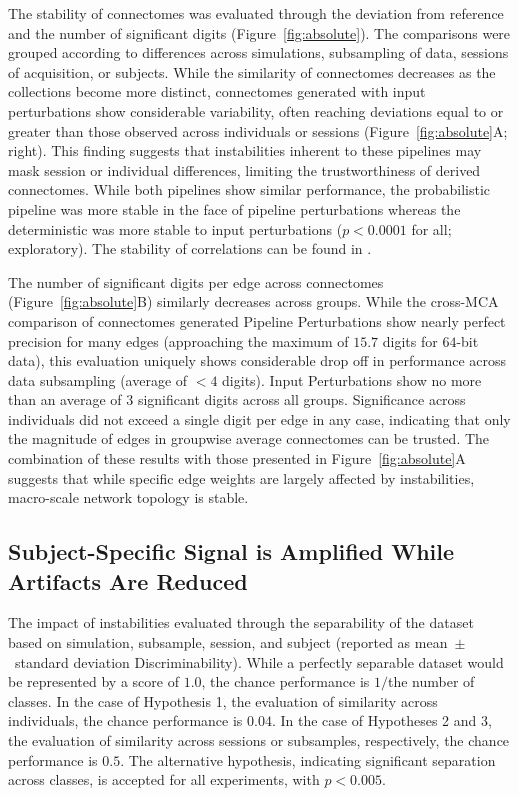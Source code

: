 \documentclass[fleqn,10pt]{SelfArx} %
\begin{document}
The stability of connectomes was evaluated through the deviation from reference and the number of significant digits
(Figure~\ref{fig:absolute}). The comparisons were grouped according to differences across simulations, subsampling
of data, sessions of acquisition, or subjects. While the similarity of connectomes decreases as the collections become
more distinct, connectomes generated with input perturbations show considerable variability, often reaching deviations
equal to or greater than those observed across individuals or sessions (Figure~\ref{fig:absolute}A; right). This
finding suggests that instabilities inherent to these pipelines may mask session or individual differences, limiting
the trustworthiness of derived connectomes. While both pipelines show similar performance, the probabilistic pipeline
was more stable in the face of pipeline perturbations whereas the deterministic was more stable to input perturbations
($p < 0.0001$ for all; exploratory). The stability of correlations can be found in .

The number of significant digits per edge across connectomes (Figure~\ref{fig:absolute}B) similarly decreases across
groups. While the cross-MCA comparison of connectomes generated Pipeline Perturbations show nearly perfect precision
for many edges (approaching the maximum of $15.7$ digits for $64$-bit data), this evaluation uniquely shows
considerable drop off in performance across data subsampling (average of $< 4$ digits). Input Perturbations show no
more than an average of $3$ significant digits across all groups. Significance across individuals did not exceed a
single digit per edge in any case, indicating that only the magnitude of edges in groupwise average connectomes can be
trusted. The combination of these results with those presented in Figure~\ref{fig:absolute}A suggests that while
specific edge weights are largely affected by instabilities, macro-scale network topology is stable.

\subsection*{Subject-Specific Signal is Amplified While Artifacts Are Reduced}
\begin{table}[ht]\centering
\caption{The impact of instabilities evaluated through the separability of the dataset based on simulation, subsample,
session, and subject (reported as mean~$\pm$~standard deviation Discriminability). While a perfectly separable dataset
would be represented by a score of $1.0$, the chance performance is $1 /$the number of classes. In the case of
Hypothesis 1, the evaluation of similarity across individuals, the chance performance is $0.04$. In the case of
Hypotheses 2 and 3, the evaluation of similarity across sessions or subsamples, respectively, the chance performance is
$0.5$. The alternative hypothesis, indicating significant separation across classes, is accepted for all experiments,
with $p < 0.005$.}
\vspace{5pt}

\label{tab:discrim}
\end{table}
\end{document}
